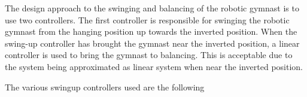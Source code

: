 The design approach to the swinging and balancing of the robotic gymnast is to use two controllers. The first controller is responsible for swinging the robotic gymnast from the hanging position up towards the inverted position. When the swing-up controller has brought the gymnast near the inverted position, a linear controller is used to bring the gymnast to balancing. This is acceptable due to the system being approximated as  linear system when near the inverted position.

The various swingup controllers used are the following




\begin{comment}


The ordinary differential equations (ODE's) describing a system can be arranged as a set of linear differential equations. Describing a system in such a way is known as the State Space design approach, where the solution is the trajectory of the chosen state variables.\cite{textbook}

These ODE's are required to be written as vectors in the state-variable form seen in equation (\ref{eq:statespace1}) and (\ref{eq:statespace2})
\begin{equation} \label{eq:statespace1}
\centering
\boldsymbol{\dot{x}} = \boldsymbol{A}\boldsymbol{x} + \boldsymbol{B}u
\end{equation}
\begin{equation} \label{eq:statespace2}
\centering
\boldsymbol{y} = \boldsymbol{C}\boldsymbol{x} + Du
\end{equation}
The \textit{n}th-column vector $\boldsymbol{x}$ is called the state of the system for a \textit{n}th-order system. The \textbf{A} matrix is the system matrix, containing \textit{n}$\times$\textit{n} elements and the input matrix is the \textit{n}$\times 1$ \textbf{B} matrix. \textbf{C} is a $1\times$\textit{n} row matrix called the output matrix and the scalar D is known as the direct transmission term \cite{textbook}.

A system parameter of great interest to control engineers are the poles of the system. It provides the characteristic response of the system starting at a initial condition with no forcing function. These poles,\textbf{s}, are the natural frequencies of the system and the state space representation allow these poles to be easy identified. The poles are the solution to the eigenvalue problem of the \textbf{A} matrix shown in equation (\ref{eq:statespace_eigen}) \cite{textbook}.
\begin{equation} \label{eq:statespace_eigen}
\centering
\text{det}(s\boldsymbol{I} - \boldsymbol{A}) = 0
\end{equation}


\end{comment}
